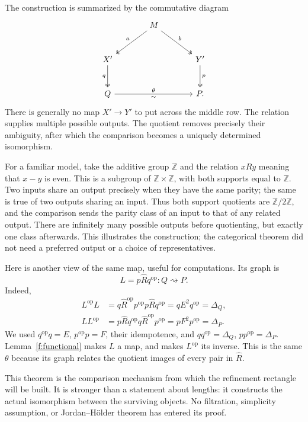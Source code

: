 The construction is summarized by the commutative diagram
\[
\begin{tikzcd}[column sep=large,row sep=large]
&M \arrow[dl,two heads,"a"'] \arrow[dr,two heads,"b"]&\\
X' \arrow[d,two heads,"q"'] &&Y' \arrow[d,two heads,"p"]\\
Q \arrow[rr,"\theta", "\sim"'] &&P.
\end{tikzcd}
\]
There is generally no map $X'\to Y'$ to put across the middle row.
The relation supplies multiple possible outputs. The quotient removes
precisely their ambiguity, after which the comparison becomes a
uniquely determined isomorphism.

For a familiar model, take the additive group $\mathbb Z$ and the relation
$xRy$ meaning that $x-y$ is even. This is a subgroup of
$\mathbb Z\times\mathbb Z$, with both supports equal to $\mathbb Z$.
Two inputs share an output precisely when they have the same parity;
the same is true of two outputs sharing an input. Thus both support
quotients are $\mathbb Z/2\mathbb Z$, and the comparison sends the parity
class of an input to that of any related output. There are infinitely
many possible outputs before quotienting, but exactly one class afterwards.
This illustrates the construction; the categorical theorem did not need
a preferred output or a choice of representatives.

Here is another view of the same map, useful for computations. Its
graph is
\[
L=p\widehat Rq^{\mathrm{op}}:Q\rightsquigarrow P.
\]
Indeed,
\begin{align*}
L^{\mathrm{op}}L
 &=q\widehat R^{\mathrm{op}}p^{\mathrm{op}}p
       \widehat Rq^{\mathrm{op}}
   =qE^2q^{\mathrm{op}}=\Delta_Q,\\
LL^{\mathrm{op}}
 &=p\widehat Rq^{\mathrm{op}}q
       \widehat R^{\mathrm{op}}p^{\mathrm{op}}
   =pF^2p^{\mathrm{op}}=\Delta_P.
\end{align*}
We used $q^{\mathrm{op}}q=E$, $p^{\mathrm{op}}p=F$, their
idempotence, and $qq^{\mathrm{op}}=\Delta_Q$,
$pp^{\mathrm{op}}=\Delta_P$. Lemma~\ref{f:functional} makes $L$ a
map, and makes $L^{\mathrm{op}}$ its inverse. This is the same $\theta$
because its graph relates the quotient images of every pair in
$\widehat R$.

This theorem is the comparison mechanism from which the refinement
rectangle will be built. It is stronger than a statement about lengths:
it constructs the actual isomorphism between the surviving objects.
No filtration, simplicity assumption, or Jordan--H\"older theorem has
entered its proof.

